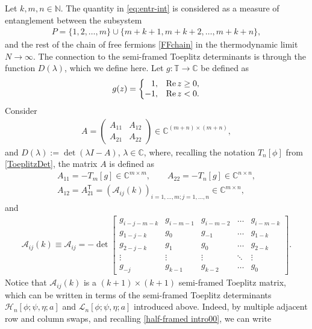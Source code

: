 \documentclass[10pt,a4paper]{amsart}
\numberwithin{equation}{section}
\newcommand{\C}{{\mathbb C}}
\newcommand{\N}{{\mathbb N}}
\newcommand{\T}{{\mathbb T}}
\newcommand{\la}{\lambda}
\begin{document}
	Let $k,m,n\in\N$. The quantity in \eqref{eq:entr-int} is considered as a measure of entanglement between the subsystem
	\begin{gather*}%
		P = \{1,2,\dots, m\}\cup\{m+k+1,m+k+2,\dots,m+k+n\},
	\end{gather*}
	and the rest of the chain of free fermions \eqref{FFchain} in the thermodynamic limit $N \to \infty$. The connection to the semi-framed Toeplitz determinants is through the function $D(\la)$, which we define here. Let $g\colon \T \to \C$ be defined as
	\begin{equation}\label{entanglement symbol}
		g(z) = \left\{ \begin{matrix}
			\hphantom{-}1, & \operatorname{Re} z \geq 0, \\
			-1, & \operatorname{Re} z < 0.
		\end{matrix} \right.
	\end{equation}
	Consider
	\begin{gather*}%
		A = \left(\begin{matrix}
			A_{11} & A_{12} \\
			A_{21} & A_{22}
		\end{matrix}\right)\in\C^{(m+n)\times(m+n)},
	\end{gather*}
 and $D(\lambda) := \det(\lambda I - A)$, $\lambda\in\C$, where, recalling the notation $T_n[\phi]$ from \eqref{ToeplitzDet}, the matrix $A$ is defined as
	\begin{gather*}%
		A_{11} = -T_m[g]\in\C^{m\times m}, \qquad A_{22} = -T_n[g]\in\C^{n\times n}, \\ A_{12} = A_{21}^{\mathsf T} = (\mathscr{A}_{ij}(k))_{i=1,\dots, m; j=1,\dots, n}\in\C^{m\times n},
	\end{gather*}
	and
	\begin{gather*}%
		\mathscr{A}_{ij}(k) \equiv \mathscr{A}_{ij} = -\det \begin{bmatrix}
			g_{i-j-m-k} & g_{i-m-1} & g_{i-m-2} & \dots & g_{i-m-k} \\
			g_{1-j-k} & g_0 & g_{-1} & \dots & g_{1-k} \\
			g_{2-j-k} & g_1 & g_0 & \dots & g_{2-k} \\
			\vdots & \vdots & \vdots & \ddots & \vdots \\
			g_{-j} & g_{k-1} & g_{k-2} & \dots & g_0
		\end{bmatrix}.
	\end{gather*}
	Notice that $ \mathscr{A}_{ij}(k)$ is a $(k+1)\times(k+1)$ semi-framed Toeplitz matrix, which can be written in terms of the semi-framed Toeplitz determinants $\mathscr{H}_n[\phi;\psi,\eta;a]$ and $\mathscr{L}_n[\phi;\psi,\eta;a]$ introduced above. Indeed, by multiple adjacent row and column swaps, and recalling \eqref{half-framed intro00}, we can write
\end{document}
